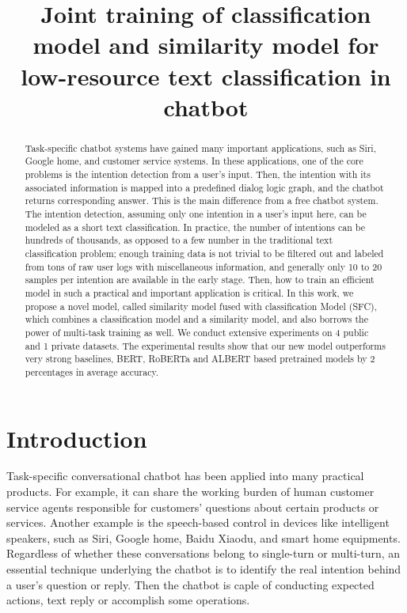 \documentclass[letterpaper]{article} %
\title{     
  Joint training of classification model and similarity model for low-resource
  text classification in chatbot
}
\begin{document}
  \maketitle

  \begin{abstract}
    Task-specific  chatbot systems have gained many important applications, such
    as  Siri,  Google home, and customer service systems. In these applications,
    one  of  the  core  problems is the intention detection from a user's input.
    Then,  the  intention  with  its  associated  information  is  mapped into a
    predefined dialog logic graph, and the chatbot returns corresponding answer.
    This  is  the  main  difference  from  a  free chatbot system. The intention
    detection,  assuming  only  one  intention  in  a  user's input here, can be
    modeled  as  a  short  text  classification.  In  practice,  the  number  of
    intentions  can  be hundreds of thousands, as opposed to a few number in the
    traditional text classification problem; enough training data is not trivial
    to be filtered out and labeled from tons of raw user logs with miscellaneous
    information, and generally only 10 to 20 samples per intention are available
    in  the  early  stage.  Then,  how  to  train  an  efficient model in such a
    practical  and important application is critical. In this work, we propose a
    novel  model, called similarity model fused with classification Model (SFC),
    which  combines  a  classification  model  and  a similarity model, and also
    borrows  the  power  of  multi-task  training  as well. We conduct extensive
    experiments  on  4  public  and 1 private datasets. The experimental results
    show that our new model outperforms very strong baselines, BERT, RoBERTa and
    ALBERT based pretrained models by 2 percentages in average accuracy.

  \end{abstract}

  \section{Introduction}
  \label{sec:intro}

  Task-specific  conversational  chatbot  \cite{wen2016network}  has been applied
  into  many practical products. For example, it can share the working burden of
  human  customer  service  agents  responsible  for  customers' questions about
  certain  products  or services. Another example is the speech-based control in
  devices  like  intelligent  speakers, such as Siri, Google home, Baidu Xiaodu,
  and smart home equipments. Regardless of whether these conversations belong to
  single-turn or multi-turn, an essential technique underlying the chatbot is to
  identify  the  real  intention  behind  a  user's  question or reply. Then the
  chatbot  is caple of conducting expected actions, text reply or accomplish some
  operations.
\end{document}
